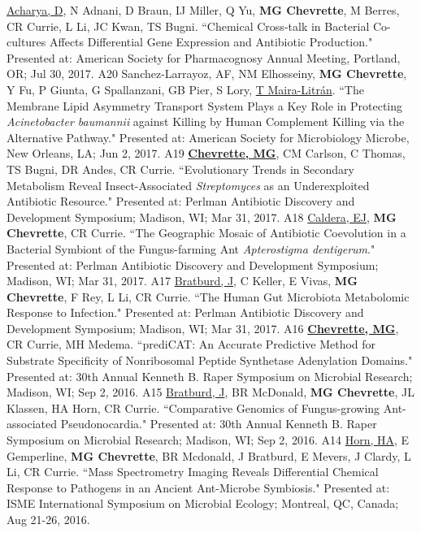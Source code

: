 \begin{cvpubs}
  \cvpub
    {\underline{Acharya, D}, N Adnani, D Braun, IJ Miller, Q Yu, \textbf{MG Chevrette}, M Berres, CR Currie, L Li, JC Kwan, TS Bugni. ``Chemical Cross-talk in Bacterial Co-cultures Affects Differential Gene Expression and Antibiotic Production." Presented at: American Society for Pharmacognosy Annual Meeting, Portland, OR; Jul 30, 2017.} %
    {A20} %
  \cvpub
    {Sanchez-Larrayoz, AF, NM Elhosseiny, \textbf{MG Chevrette}, Y Fu, P Giunta, G Spallanzani, GB Pier, S Lory, \underline{T Maira-Litr\'{a}n}. ``The Membrane Lipid Asymmetry Transport System Plays a Key Role in Protecting \textit{Acinetobacter baumannii} against Killing by Human Complement Killing via the Alternative Pathway." Presented at: American Society for Microbiology Microbe, New Orleans, LA; Jun 2, 2017.} %
    {A19} %
  \cvpub
    {\underline{\textbf{Chevrette, MG}}, CM Carlson, C Thomas, TS Bugni, DR Andes, CR Currie. ``Evolutionary Trends in Secondary Metabolism Reveal Insect-Associated \textit{Streptomyces} as an Underexploited Antibiotic Resource." Presented at: Perlman Antibiotic Discovery and Development Symposium; Madison, WI; Mar 31, 2017.} %
    {A18} %
  \cvpub
    {\underline{Caldera, EJ}, \textbf{MG Chevrette}, CR Currie. ``The Geographic Mosaic of Antibiotic Coevolution in a Bacterial Symbiont of the Fungus-farming Ant \textit{Apterostigma dentigerum}." Presented at: Perlman Antibiotic Discovery and Development Symposium; Madison, WI; Mar 31, 2017.} %
    {A17} %
  \cvpub
    {\underline{Bratburd, J}, C Keller, E Vivas, \textbf{MG Chevrette}, F Rey, L Li, CR Currie. ``The Human Gut Microbiota Metabolomic Response to Infection." Presented at: Perlman Antibiotic Discovery and Development Symposium; Madison, WI; Mar 31, 2017.} %
    {A16} %
  \cvpub
    {\textbf{\underline{Chevrette, MG}}, CR Currie, MH Medema.  ``prediCAT: An Accurate Predictive Method for Substrate Specificity of Nonribosomal Peptide Synthetase Adenylation Domains." Presented at: 30th Annual Kenneth B. Raper Symposium on Microbial Research; Madison, WI; Sep 2, 2016.} %
    {A15} %
  \cvpub
    {\underline{Bratburd, J}, BR McDonald, \textbf{MG Chevrette}, JL Klassen, HA Horn, CR Currie. ``Comparative Genomics of Fungus-growing Ant-associated Pseudonocardia." Presented at: 30th Annual Kenneth B. Raper Symposium on Microbial Research; Madison, WI; Sep 2, 2016.} %
    {A14} %
  \cvpub
    {\underline{Horn, HA}, E Gemperline, \textbf{MG Chevrette}, BR Mcdonald, J Bratburd, E Mevers, J Clardy, L Li, CR Currie. ``Mass Spectrometry Imaging Reveals Differential Chemical Response to Pathogens in an Ancient Ant-Microbe Symbiosis." Presented at: ISME International Symposium on Microbial Ecology; Montreal, QC, Canada; Aug 21-26, 2016.} %

\end{cvpubs}
